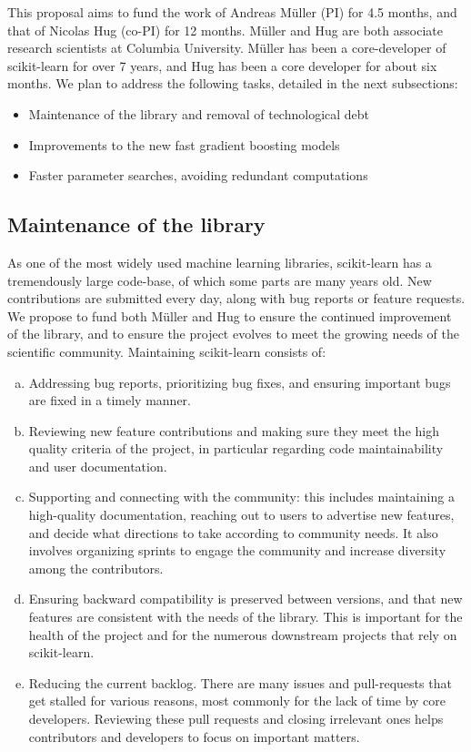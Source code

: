 \documentclass[11pt]{article}  %
\begin{document}
This proposal aims to fund the work of Andreas M\"uller (PI) for 4.5 months,
and that of Nicolas Hug (co-PI) for 12 months. M\"uller and Hug are both
associate research scientists at Columbia University. M\"uller has been a
core-developer of scikit-learn for over 7 years, and Hug has been a core
developer for about six months. We plan to address the following tasks,
detailed in the next subsections:
\begin{itemize}
\item Maintenance of the library and removal of technological debt
\item Improvements to the new fast gradient boosting models
\item Faster parameter searches, avoiding redundant computations
\end{itemize}

\subsection{Maintenance of the library}

As one of the most widely used machine learning libraries, scikit-learn has
a tremendously large code-base, of which some parts are many years old. New contributions are submitted every day, along with bug reports or
feature requests. We propose to fund both M\"uller and Hug to ensure the
continued improvement of the library, and to ensure the project evolves to
meet the growing needs of the scientific community. Maintaining scikit-learn consists of:

\begin{enumerate}[a)]
\item Addressing bug reports, prioritizing bug fixes, and ensuring important bugs are fixed in a timely manner.
\item Reviewing new feature contributions and making sure they meet the high
quality criteria of the project, in particular regarding code
maintainability and user documentation.
\item Supporting and connecting with the community: this includes
maintaining a high-quality documentation, reaching out to users to advertise
new features, and decide what directions to take according to community
needs. It also involves organizing sprints to engage the community and
increase diversity among the contributors.
\item Ensuring backward compatibility is preserved between versions, and
that new features are consistent with the needs of the library. This is
important for the health of the project and for the numerous downstream
projects that rely on scikit-learn.
\item Reducing the current backlog. There are many issues and pull-requests that get stalled for various reasons, most commonly for the lack of time by core developers. Reviewing these pull requests and closing irrelevant ones helps contributors and developers to focus on important matters.
\end{enumerate}
\end{document}
